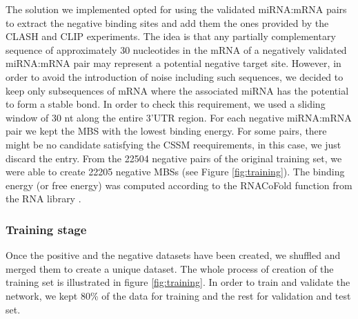 The solution we implemented opted for using the validated miRNA:mRNA pairs to extract the negative binding sites and add them the ones provided by the CLASH and CLIP experiments. The idea is that any partially complementary sequence of approximately 30 nucleotides in the mRNA of a negatively validated miRNA:mRNA pair may represent a potential negative target site. However, in order to avoid the introduction of noise including such sequences, we decided to keep only subsequences of mRNA where the associated miRNA has the potential to form a stable bond. In order to check this requirement, we used a sliding window of 30 nt along the entire 3'UTR region. For each negative miRNA:mRNA pair we kept the  MBS with the lowest binding energy. For some pairs, there might be no candidate satisfying the CSSM reequirements, in this case, we just discard the entry. From the 22504 negative pairs of the original training set, we were able to create 22205 negative MBSs (see Figure \ref{fig:training}). The binding energy (or free energy) was  computed according to the RNACoFold function from the RNA library \cite{vienna_rna}. 

\subsubsection{Training stage}
Once the positive and the negative datasets have been created, we shuffled and merged them to create a unique dataset. The whole process of creation of the training set is illustrated in figure \ref{fig:training}. In order to train and validate the network, we kept 80\% of the data for training and the rest for validation and test set. 

